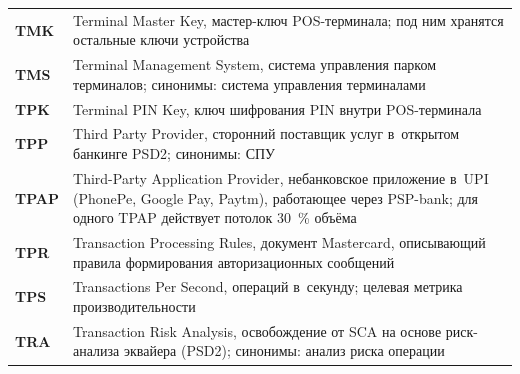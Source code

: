 \begin{longtable}{@{}p{4.5em}p{\dimexpr\linewidth-4.5em-2\tabcolsep\relax}@{}}
  \textbf{TMK}               & Terminal Master Key, мастер-ключ POS-терминала; под ним хранятся остальные ключи устройства                                                                                                                                                                                                      \\
  \textbf{TMS}               & Terminal Management System, система управления парком терминалов; синонимы: система управления терминалами                                                                                                                                                                                       \\
  \textbf{TPK}               & Terminal PIN Key, ключ шифрования PIN внутри POS-терминала                                                                                                                                                                                                                                       \\
  \textbf{TPP}               & Third Party Provider, сторонний поставщик услуг в~открытом банкинге PSD2; синонимы: СПУ                                                                                                                                                                                                          \\
  \textbf{TPAP}              & Third-Party Application Provider, небанковское приложение в~UPI (PhonePe, Google Pay, Paytm), работающее через PSP-bank; для одного TPAP действует потолок 30~\% объёма                                                                                                                          \\
  \textbf{TPR}               & Transaction Processing Rules, документ Mastercard, описывающий правила формирования авторизационных сообщений                                                                                                                                          \\
  \textbf{TPS}               & Transactions Per Second, операций в~секунду; целевая метрика производительности                                                                                                                                                                                                                  \\
  \textbf{TRA}               & Transaction Risk Analysis, освобождение от SCA на основе риск-анализа эквайера (PSD2); синонимы: анализ риска операции                                                                                                                                                                            \\

\end{longtable}
